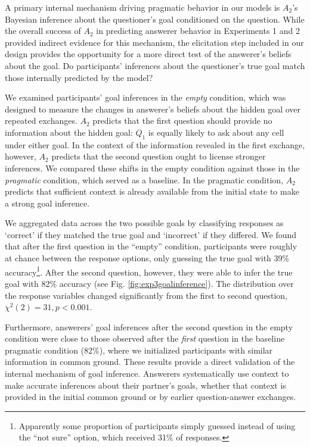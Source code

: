 \documentclass[11pt, floatsintext]{apa6}
\begin{document}
A primary internal mechanism driving pragmatic behavior in our models is $A_2$'s Bayesian inference about the questioner's goal conditioned on the question. 
While the overall success of $A_2$ in predicting answerer behavior in Experiments 1 and 2 provided indirect evidence for this mechanism, the elicitation step included in our design provides the opportunity for a more direct test of the answerer's beliefs about the goal.
Do participants' inferences about the questioner's true goal match those internally predicted by the model?

We examined participants' goal inferences in the \emph{empty} condition, which was designed to measure the changes in answerer's beliefs about the hidden goal over repeated exchanges. 
$A_2$ predicts that the first question should provide no information about the hidden goal: $Q_1$ is equally likely to ask about any cell under either goal.
In the context of the information revealed in the first exchange, however, $A_2$ predicts that the second question ought to license stronger inferences.
We compared these shifts in the empty condition against those in the \emph{pragmatic} condition, which served as a baseline.
In the pragmatic condition, $A_2$ predicts that sufficient context is already available from the initial state to make a strong goal inference.

We aggregated data across the two possible goals by classifying responses as `correct' if they matched the true goal and `incorrect' if they differed.
We found that after the first question in the ``empty'' condition, participants were roughly at chance between the response options, only guessing the true goal with 39\% accuracy\footnote{Apparently some proportion of participants simply guessed instead of using the ``not sure'' option, which received 31\% of responses.}.
After the second question, however, they were able to infer the true goal with 82\% accuracy (see Fig. \ref{fig:exp3goalinference}).
The distribution over the response variables changed significantly from the first to second question, $\chi^2(2) = 31, p < 0.001$.

Furthermore, answerers' goal inferences after the second question in the empty condition were close to those observed after the \emph{first} question in the baseline pragmatic condition (82\%), where we initialized participants with similar information in common ground.
These results provide a direct validation of the internal mechanism of goal inference.
Answerers systematically use context to make accurate inferences about their partner's goals, whether that context is provided in the initial common ground or by earlier question-answer exchanges.
\end{document}
